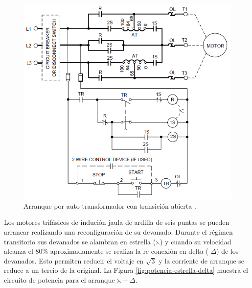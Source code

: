 \begin{figure}
	\centering
	\includegraphics[width=0.6\linewidth]{Imagenes/Control-Auto-transformador}
	\caption{Arranque por auto-transformador con transición abierta \cite{Scheneider5}. }
	\label{fig:control-auto-transformador}
\end{figure}

Los motores trifásicos de indución jaula de ardilla de seis puntas se pueden arrancar realizando una reconfiguración de su devanado. Durante el régimen transitorio  sus devanados se alambran en estrella ($\leftthreetimes$) y cuando su velocidad alcanza el 80\% aproximadamente se realiza la re-conexión en delta ( $\Delta$) de los devanados. Esto permiten reducir el voltaje en $\sqrt{3}$ y la corriente de arranque se reduce a un tercio de la original. La Figura \ref{fig:potencia-estrella-delta} muestra el circuito de potencia para el arranque $\leftthreetimes-\Delta$.

